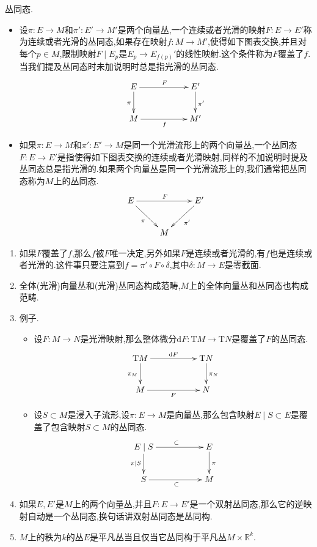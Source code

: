 丛同态.
\begin{itemize}
	\item 设$\pi:E\to M$和$\pi':E'\to M'$是两个向量丛,一个连续或者光滑的映射$F:E\to E'$称为连续或者光滑的丛同态,如果存在映射$f:M\to M'$,使得如下图表交换,并且对每个$p\in M$,限制映射$F\mid E_p$是$E_p\to E_{f(p)}'$的线性映射.这个条件称为$F$覆盖了$f$.当我们提及丛同态时未加说明时总是指光滑的丛同态.
	$$\xymatrix{E\ar[rr]^F\ar[d]_{\pi}&&E'\ar[d]^{\pi'}\\M\ar[rr]_f&&M'}$$
	\item 如果$\pi:E\to M$和$\pi':E'\to M$是同一个光滑流形上的两个向量丛,一个丛同态$F:E\to E'$是指使得如下图表交换的连续或者光滑映射,同样的不加说明时提及丛同态总是指光滑的.如果两个向量丛是同一个光滑流形上的,我们通常把丛同态称为$M$上的丛同态.
	$$\xymatrix{E\ar[rr]^F\ar[dr]_{\pi}&&E'\ar[dl]^{\pi'}\\&M&}$$
\end{itemize}
\begin{enumerate}
	\item 如果$F$覆盖了$f$,那么$f$被$F$唯一决定,另外如果$F$是连续或者光滑的,有$f$也是连续或者光滑的.这件事只要注意到$f=\pi'\circ F\circ\delta$,其中$\delta:M\to E$是零截面.
    \item 全体(光滑)向量丛和(光滑)丛同态构成范畴,$M$上的全体向量丛和丛同态也构成范畴.
    \item 例子.
    \begin{itemize}
    	\item 设$F:M\to N$是光滑映射,那么整体微分$\mathrm{d}F:\mathrm{T}M\to\mathrm{T}N$是覆盖了$F$的丛同态.
    	$$\xymatrix{\mathrm{T}M\ar[rr]^{\mathrm{d}F}\ar[d]_{\pi_M}&&\mathrm{T}N\ar[d]^{\pi_N}\\M\ar[rr]_F&&N}$$
    	\item 设$S\subset M$是浸入子流形,设$\pi:E\to M$是向量丛,那么包含映射$E\mid S\subset E$是覆盖了包含映射$S\subset M$的丛同态.
    	$$\xymatrix{E\mid S\ar[rr]^{\subset}\ar[d]_{\pi\mid S}&&E\ar[d]^{\pi}\\S\ar[rr]_{\subset}&&M}$$
    \end{itemize}
    \item 如果$E,E'$是$M$上的两个向量丛,并且$F:E\to E'$是一个双射丛同态,那么它的逆映射自动是一个丛同态,换句话讲双射丛同态是丛同构.
    \item $M$上的秩为$k$的丛$E$是平凡丛当且仅当它丛同构于平凡丛$M\times\mathbb{R}^k$.
\end{enumerate}

